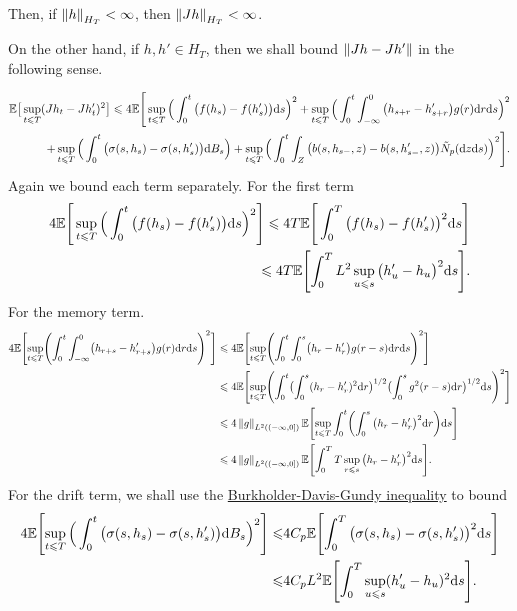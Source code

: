 \documentclass[8pt,onesided]{article}
\begin{document}
Then, if $\left\lVert h\right\rVert_{H_T}<\infty$, then $\left\lVert Jh\right\rVert_{H_T}<\infty$.


On the other hand, if $h,h'\in H_T$, then we shall bound $\left\lVert Jh-Jh'\right\rVert$ in the following sense.

\begin{align*}
\mathbb{E}\big[ \sup_{t\leqslant T}(Jh_t-Jh'_t)^2\big]\leqslant 4 \mathbb{E}\Bigg[ 
\sup_{t\leqslant T}\Big(\int_0^t \big(f(h_s)-f(h'_s)\big)\dd s \Big)^2
+\sup_{t\leqslant T} \Big(\int_0^t\int_{-\infty}^0 \big(h_{s+r}-h'_{s+r}\big) g(r)\dd r \dd s\Big)^2\\
+\sup_{t\leqslant T} \Big( \int_0^t \big(\sigma(s,h_s)-\sigma(s,h'_s)\big)\dd B_s\Big)
+ \sup_{t\leqslant T}\Big(\int_0^t \int_Z \big(b(s, h_{s-},z)-b(s, h'_{s-},z)\big)\tilde N_p(\dd z \dd s)\Big)^2
\Bigg].
\end{align*}
 Again we bound each term separately. For the first term
\begin{align*}
    4 \mathbb{E}\Bigg[ 
        \sup_{t\leqslant T}\Big(\int_0^t \big(f(h_s)-f(h'_s)\big)\dd s \Big)^2\Bigg]\leqslant4T\mathbb{E} \Bigg[\int_0^T \big(f(h_s)-f(h'_s)\big)^2\dd s\Bigg]\\
        \leqslant 4T \mathbb{E}\Biggl[ \int_0^T L^2 \sup_{u\leqslant s} \big(h'_u-h_u\big)^2 \dd s \Biggr].
\end{align*}
For the memory term.
\begin{align*}
4\mathbb{E}\Biggl[ \sup_{t\leqslant T }\Biggl(  \int_0^t \int_{-\infty}^0 \bigl( h_{r+s} - h'_{r+s} \bigr)g(r)\dd r \dd s\Biggr)^2\Biggr]
&\leqslant
4\mathbb{E}\Biggl[ \sup_{t\leqslant T }\Biggl(  \int_0^t \int_{0}^s \bigl( h_{r} - h'_{r} \bigr)g(r-s)\dd r \dd s\Biggr)^2\Biggr]\\
&\leqslant4\mathbb{E}\Biggl[ \sup_{t\leqslant T} \Biggl(   \int_0^t \bigl(\int_0^s (h_r - h'_r)^2\dd r   \bigr)^{1/2}\bigl(\int_0^s g^2(r-s)\dd r   \bigr)^{1/2} \dd s\Biggr)^2\Biggr]\\
&\leqslant4 \left\lVert g\right\rVert_{L^2((-\infty,0])} \mathbb{E} \Biggl[ \sup_{t\leqslant T} \int_0^t \biggl( \int_0^s  \big(h_r-h'_r\big)^2 \dd r \biggr)\dd s \Biggr]\\
&\leqslant 4\left\lVert g\right\rVert_{L^2((-\infty,0])} \mathbb{E} \Biggl[ \int_0^T  T \sup_{r\leqslant s}\big(
    h_r -h'_r\big)^2\dd s \Biggr].
\end{align*}
For the drift term, we shall use the \hyperref[bdg]{Burkholder-Davis-Gundy inequality} to bound
\begin{align*}
    4\mathbb{E} \Biggl[\sup_{t\leqslant T}\Big( \int_0^t \big(\sigma(s,h_s)-\sigma(s,h'_s)\big)\dd B_s\Big)^2\Biggr]\leqslant& 4C_p\mathbb{E} \Biggl[\int_0^T \big(\sigma(s,h_s)-\sigma(s,h'_s)\big)^2 \dd s\Biggr]\\
    \leqslant& 4C_pL^2 \mathbb{E}\Biggl[ \int_0^T \sup_{u\leqslant s}(h'_u-h_u)^2 \dd s \Biggr].
\end{align*}
\end{document}
